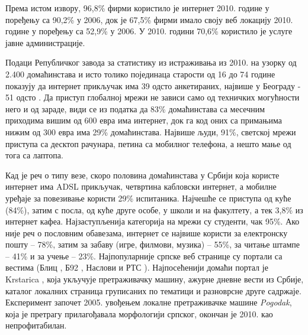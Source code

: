 {\begin{multicols}{2}

Према истом извору, 96,8\% фирми користило је интернет 2010. године у поређењу са 90,2\% у  2006, док је 67,5\% фирми имало  своју веб локацију 2010. године у поређењу са 52,9\% у 2006. У 2010. години 70,6\% користило је услуге јавне администрације.

Подаци Републичког завода за статистику из истраживања из 2010. на узорку од 2.400 домаћинстава и исто толико појединаца старости од 16 до 74 године показују да интернет прикључак има 39 одсто анкетираних, највише у Београду - 51 одсто \cite{ICT2010}. Да приступ глобалној мрежи не зависи само од техничких могућности него и од зараде, види се из податка да 83\% домаћинстава са месечним приходима вишим од 600 евра има интернет, док га код оних са примањима нижим од 300 евра има 29\% домаћинстава. Највише људи, 91\%, светској мрежи приступа са десктоп рачунара, петина са мобилног телефона, а нешто мање од тога са лаптопа. 

Кад је реч о типу везе, скоро половина домаћинстава у Србији која користе интернет има ADSL прикључак, четвртина кабловски интернет, а мобилне уређаје за повезивање користи 29\% испитаника. Најчешће се приступа од куће (84\%), затим с посла, од куће друге особе, у школи и на факултету, а  тек 3,8\% из интернет кафеа. Најзаступљенија категорија на мрежи су студенти, чак 95\%. Ако није реч о пословним обавезама, интернет се највише користи за електронску пошту – 78\%, затим за забаву (игре, филмови, музика) – 55\%, за читање штампе – 41\% и за учење – 23\%. Најпопуларније српске веб странице су портали са вестима (Блиц \cite{BLIC}, Б92 \cite{B92}, Наслови \cite{NASLOVI} и РТС \cite{RTS}). Најпосећенији домаћи портал је Krstarica \cite{KRSTARICA},  која укључује претраживачку машину, ажурне дневне вести из Србије, каталог локалних страница груписаних по тематици и разноврсне друге садржаје. Експеримент започет 2005.  увођењем локалне претраживачке машине \textit{Pogodak}, која је претрагу прилагођавала морфологији српског, окончан је 2010. као непрофитабилан. 


\end{multicols}}
